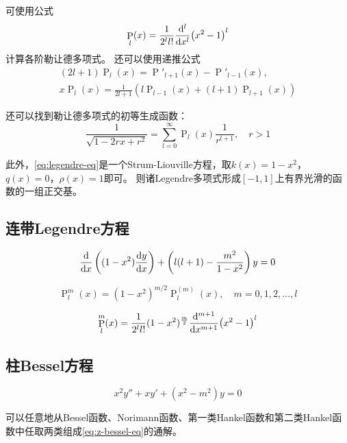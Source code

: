 \documentclass[UTF8]{ctexart}
\DeclareMathOperator{\legpoly}{P}
\begin{document}
可使用公式
\begin{equation}
    \legpoly_l (x) = \frac{1}{2^l l!} \dv[l]{x} (x^2 - 1)^l
\end{equation}
计算各阶勒让德多项式。
还可以使用递推公式
\begin{equation}
    \begin{split}
        (2l+1)\legpoly_l(x) = \legpoly'_{l+1}(x) - \legpoly'_{l-1}(x), \\ 
        x \legpoly_l(x) = \frac{1}{2l+1} (l \legpoly_{l-1}(x) + (l+1)\legpoly_{l+1}(x))
    \end{split}
\end{equation}

还可以找到勒让德多项式的初等生成函数：
\begin{equation}
    \frac{1}{\sqrt{1 - 2rx + r^2}} = \sum_{l=0}^\infty \legpoly_l(x) \frac{1}{r^{l+1}}, \quad r > 1
\end{equation}

此外，\eqref{eq:legendre-eq}是一个Strum-Liouville方程，取$k(x)=1-x^2$，$q(x)=0$，$\rho(x)=1$即可。
则诸Legendre多项式形成$[-1, 1]$上有界光滑的函数的一组正交基。

\subsection{连带Legendre方程}

\begin{equation}
    \dv{x} \left( (1-x^2) \dv{y}{x} \right) + \left( l(l+1) - \frac{m^2}{1-x^2} \right) y = 0
\end{equation}

\begin{equation}
    \legpoly_l^m(x) = (1-x^2)^{m/2} \legpoly_l^{(m)}(x), \quad m = 0, 1, 2, \ldots, l
\end{equation}

\begin{equation}
    \legpoly_l^m(x) = \frac{1}{2^l l!} (1-x^2)^{\frac{m}{2}} \dv[m+1]{x} (x^2 - 1)^l
\end{equation}

\subsection{柱Bessel方程}

\begin{equation}
    x^2 y'' + xy' + (x^2 - m^2) y = 0
    \label{eq:z-bessel-eq}
\end{equation}

可以任意地从Bessel函数、Norimann函数、第一类Hankel函数和第二类Hankel函数中任取两类组成\eqref{eq:z-bessel-eq}的通解。
\end{document}
